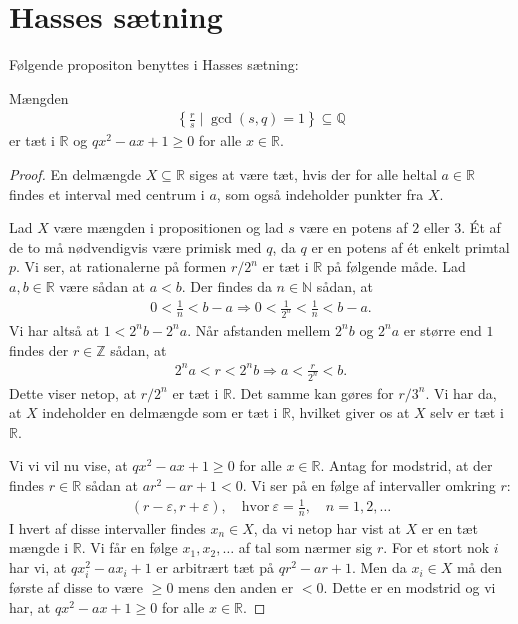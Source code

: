 \section{Hasses sætning}
Følgende propositon benyttes i Hasses sætning: 
\begin{proposition}
\label{appendiks_dense}
Mængden 
\begin{align*}
	\left\{ \frac{r}{s} \mid \gcd(s, q) = 1 \right\} \subseteq \mathbb{Q}
\end{align*}
er tæt i $\mathbb{R}$ og $qx^2 - ax + 1 \geq 0$ for alle $x \in \mathbb{R}$.
\end{proposition}
\begin{proof}
En delmængde $X \subseteq \mathbb{R}$ siges at være tæt, hvis der for alle heltal $a \in \mathbb{R}$ findes et interval med centrum i $a$, som også indeholder punkter fra $X$. 

Lad $X$ være mængden i propositionen og lad $s$ være en potens af $2$ eller $3$. Ét af de to må nødvendigvis være primisk med $q$, da $q$ er en potens af ét enkelt primtal $p$. Vi ser, at rationalerne på formen $r/2^n$ er tæt i $\mathbb{R}$ på følgende måde. Lad $a, b \in \mathbb{R}$ være sådan at $a < b$. Der findes da $n \in \mathbb{N}$ sådan, at 
\begin{align*}
	0 < \frac{1}{n} < b - a \Rightarrow 0 < \frac{1}{2^n} < \frac{1}{n} < b - a.
\end{align*}
Vi har altså at $1 < 2^n b - 2^n a$. Når afstanden mellem $2^n b$ og $2^n a$ er større end $1$ findes der $r \in \mathbb{Z}$ sådan, at
\begin{align*}
	2^n a < r < 2^n b \Rightarrow a < \frac{r}{2^n} < b.
\end{align*}
Dette viser netop, at $r/2^n$ er tæt i $\mathbb{R}$. Det samme kan gøres for $r/3^n$. Vi har da, at $X$ indeholder en delmængde som er tæt i $\mathbb{R}$, hvilket giver os at $X$ selv er tæt i $\mathbb{R}$.

Vi vi vil nu vise, at $qx^2 - ax + 1 \geq 0$ for alle $x \in \mathbb{R}$.
Antag for modstrid, at der findes $r \in \mathbb{R}$ sådan at $ar^2 -ar + 1 < 0$. Vi ser på en følge af intervaller omkring $r$:
\begin{align*}
	(r - \varepsilon, r + \varepsilon), \quad \text{hvor} \ \varepsilon = \frac{1}{n}, \quad n = 1, 2, \ldots
\end{align*}
I hvert af disse intervaller findes $x_n \in X$, da vi netop har vist at $X$ er en tæt mængde i $\mathbb{R}$. Vi får en følge $x_1, x_2, \ldots$ af tal som nærmer sig $r$. For et stort nok $i$ har vi, at $qx_{i}^{2} -ax_i + 1$ er arbitrært tæt på $qr^2 - ar + 1$. Men da $x_i \in X$ må den første af disse to være $\geq 0$ mens den anden er $< 0$. Dette er en modstrid og vi har, at 
$qx^2 - ax + 1 \geq 0$ for alle $x \in \mathbb{R}$.
\end{proof}

